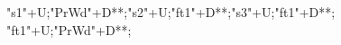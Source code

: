 \begin{multicols}{3}
\begin{exe}
{				"s1"+U;"PrWd"+D**\dir{-};"s2"+U;"ft1"+D**\dir{-};"s3"+U;"ft1"+D**\dir{-};
				"ft1"+U;"PrWd"+D**\dir{-};
		\endxy}
	\end{exe}
\end{multicols}

